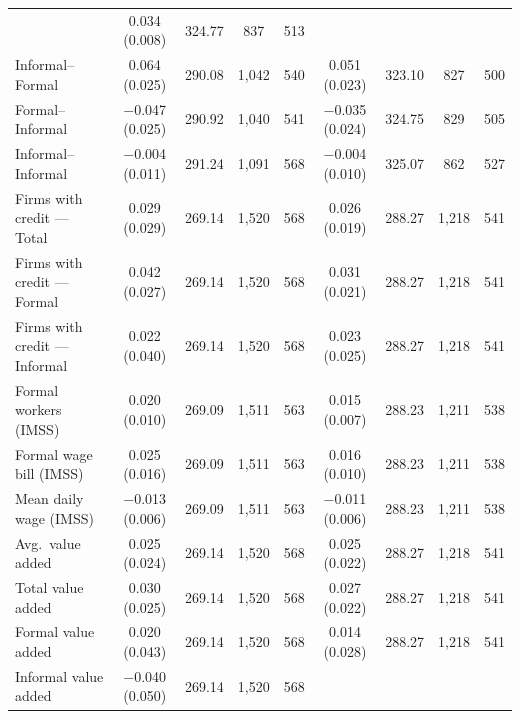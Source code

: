 \begin{threeparttable}
{\begin{tabular}{lcccccccc}
        & \phantom{$-$}0.034\sym{***} (0.008) & 324.77 & \phantom{1{,}}837 & 513 \\
        Informal--Formal
        & \phantom{$-$}0.064\sym{**} (0.025) & 290.08 & 1{,}042 & 540
        & \phantom{$-$}0.051\sym{**} (0.023) & 323.10 & \phantom{1{,}}827 & 500 \\
        Formal--Informal
        & $-$0.047\sym{*} (0.025) & 290.92 & 1{,}040 & 541
        & $-$0.035 (0.024) & 324.75 & \phantom{1{,}}829 & 505 \\
        Informal--Informal
        & $-$0.004 (0.011) & 291.24 & 1{,}091 & 568
        & $-$0.004 (0.010) & 325.07 & \phantom{1{,}}862 & 527 \\
        \midrule
        Firms with credit --- Total
        & \phantom{$-$}0.029 (0.029) & 269.14 & 1{,}520 & 568
        & \phantom{$-$}0.026 (0.019) & 288.27 & 1{,}218 & 541 \\
        Firms with credit --- Formal
        & \phantom{$-$}0.042 (0.027) & 269.14 & 1{,}520 & 568
        & \phantom{$-$}0.031 (0.021) & 288.27 & 1{,}218 & 541 \\
        Firms with credit --- Informal
        & \phantom{$-$}0.022 (0.040) & 269.14 & 1{,}520 & 568
        & \phantom{$-$}0.023 (0.025) & 288.27 & 1{,}218 & 541 \\
        \midrule
        Formal workers (IMSS)
        & \phantom{$-$}0.020\sym{**} (0.010) & 269.09 & 1{,}511 & 563
        & \phantom{$-$}0.015\sym{**} (0.007) & 288.23 & 1{,}211 & 538 \\
        Formal wage bill (IMSS)
        & \phantom{$-$}0.025 (0.016) & 269.09 & 1{,}511 & 563
        & \phantom{$-$}0.016 (0.010) & 288.23 & 1{,}211 & 538 \\
        Mean daily wage (IMSS)
        & $-$0.013\sym{**} (0.006) & 269.09 & 1{,}511 & 563
        & $-$0.011\sym{*} (0.006) & 288.23 & 1{,}211 & 538 \\
        Avg.\ value added
        & \phantom{$-$}0.025 (0.024) & 269.14 & 1{,}520 & 568
        & \phantom{$-$}0.025 (0.022) & 288.27 & 1{,}218 & 541 \\
        Total value added
        & \phantom{$-$}0.030 (0.025) & 269.14 & 1{,}520 & 568
        & \phantom{$-$}0.027 (0.022) & 288.27 & 1{,}218 & 541 \\
        Formal value added
        & \phantom{$-$}0.020 (0.043) & 269.14 & 1{,}520 & 568
        & \phantom{$-$}0.014 (0.028) & 288.27 & 1{,}218 & 541 \\
        Informal value added
        & $-$0.040 (0.050) & 269.14 & 1{,}520 & 568

\end{tabular}}
\end{threeparttable}

